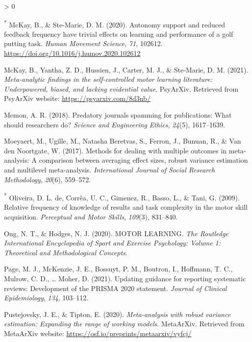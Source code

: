 \documentclass[
  english,
  man, donotrepeattitle,mask,floatsintext]{apa7}
\newlength{\cslhangindent}
\newenvironment{CSLReferences}[2] %
 {%
  \setlength{\parindent}{0pt}
  \ifodd #1 \everypar{\setlength{\hangindent}{\cslhangindent}}\ignorespaces\fi
  \ifnum #2 > 0
  \setlength{\parskip}{#2\baselineskip}
  \fi
 }%
 {}
\begin{document}
\begin{CSLReferences}{1}{0}
\leavevmode\hypertarget{ref-McKay2020}{}%
\textsuperscript{*} McKay, B., \& Ste-Marie, D. M. (2020). Autonomy support and reduced feedback frequency have trivial effects on learning and performance of a golf putting task. \emph{Human Movement Science}, \emph{71}, 102612. \url{https://doi.org/10.1016/j.humov.2020.102612}

\leavevmode\hypertarget{ref-McKay2021}{}%
McKay, B., Yantha, Z. D., Hussien, J., Carter, M. J., \& Ste-Marie, D. M. (2021). \emph{Meta-analytic findings in the self-controlled motor learning literature: Underpowered, biased, and lacking evidential value}. PsyArXiv. Retrieved from PsyArXiv website: \url{https://psyarxiv.com/8d3nb/}

\leavevmode\hypertarget{ref-Memon2018}{}%
Memon, A. R. (2018). Predatory journals spamming for publications: What should researchers do? \emph{Science and Engineering Ethics}, \emph{24}(5), 1617--1639.

\leavevmode\hypertarget{ref-Moeyaert2017}{}%
Moeyaert, M., Ugille, M., Natasha Beretvas, S., Ferron, J., Bunuan, R., \& Van den Noortgate, W. (2017). Methods for dealing with multiple outcomes in meta-analysis: A comparison between averaging effect sizes, robust variance estimation and multilevel meta-analysis. \emph{International Journal of Social Research Methodology}, \emph{20}(6), 559--572.

\leavevmode\hypertarget{ref-Oliveira2009}{}%
\textsuperscript{*} Oliveira, D. L. de, Corrêa, U. C., Gimenez, R., Basso, L., \& Tani, G. (2009). Relative frequency of knowledge of results and task complexity in the motor skill acquisition. \emph{Perceptual and Motor Skills}, \emph{109}(3), 831--840.

\leavevmode\hypertarget{ref-Ong2020}{}%
Ong, N. T., \& Hodges, N. J. (2020). MOTOR LEARNING. \emph{The Routledge International Encyclopedia of Sport and Exercise Psychology: Volume 1: Theoretical and Methodological Concepts}.

\leavevmode\hypertarget{ref-Page2021}{}%
Page, M. J., McKenzie, J. E., Bossuyt, P. M., Boutron, I., Hoffmann, T. C., Mulrow, C. D., \ldots{} Moher, D. (2021). Updating guidance for reporting systematic reviews: Development of the PRISMA 2020 statement. \emph{Journal of Clinical Epidemiology}, \emph{134}, 103--112.

\leavevmode\hypertarget{ref-Pustejovsky2020}{}%
Pustejovsky, J. E., \& Tipton, E. (2020). \emph{Meta-analysis with robust variance estimation: Expanding the range of working models}. MetaArXiv. Retrieved from MetaArXiv website: \url{https://osf.io/preprints/metaarxiv/vyfcj/}


\end{CSLReferences}
\end{document}
